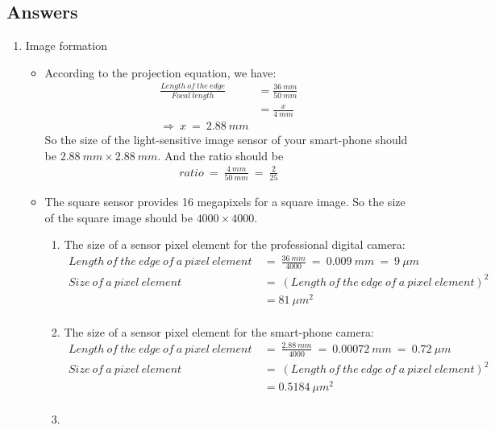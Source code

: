 \documentclass{article}
\begin{document}
\subsection{Answers}
\begin{enumerate}[label=A\arabic*)]
	\item Image formation 
		\begin{itemize}
			\item According to the projection equation, we have:
				\begin{align*}
					\frac{Length\:of\:the\:edge}{Focal\:length} &= \frac{36\:mm}{50\:mm} 
					\\ &= \frac{x}{4\:mm}
					\\ \Rightarrow\:x\:=\:2.88\:mm
				\end{align*}
				So the size of the light-sensitive image sensor of your smart-phone should be $2.88\:mm \times 2.88\:mm$. And the ratio should be
				\begin{align*}
					ratio\:=\:\frac{4\:mm}{50\:mm}\:=\:\frac{2}{25}
				\end{align*}
			 \item The square sensor provides 16 megapixels for a square image. So the size of the square image should be $4000 \times 4000$.
				\begin{enumerate}[label=(\roman*)]
					\item The size of a sensor pixel element for the professional digital camera:
						\begin{align*}
							Length\:of\:the\:edge\:of\:a\:pixel\:element\:&=\:\frac{36\:mm}{4000}\:=\:0.009\:mm\:=\:9\:\mu m \\
							Size\:of\:a\:pixel\:element\:&=\:(Length\:of\:the\:edge\:of\:a\:pixel\:element)^2 \\
							&=81\:\mu m^2 \\
						\end{align*}
					\item The size of a sensor pixel element for the smart-phone camera:
						\begin{align*}
							Length\:of\:the\:edge\:of\:a\:pixel\:element\:&=\:\frac{2.88\:mm}{4000}\:=\:0.00072\:mm\:=\:0.72\:\mu m \\
							Size\:of\:a\:pixel\:element\:&=\:(Length\:of\:the\:edge\:of\:a\:pixel\:element)^2 \\
							&=0.5184\:\mu m^2 \\
						\end{align*}
					\item 
						\begin{tabular}{ | r | c | c |}

\end{tabular}
\end{enumerate}
\end{itemize}
\end{enumerate}
\end{document}
